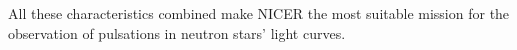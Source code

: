 \documentclass[a4paper, twoside, 12pt]{article}
\numberwithin{equation}{section}
\begin{document}
All these characteristics combined %
make NICER the most suitable mission for the observation of pulsations in neutron stars' light curves. \\
\end{document}
